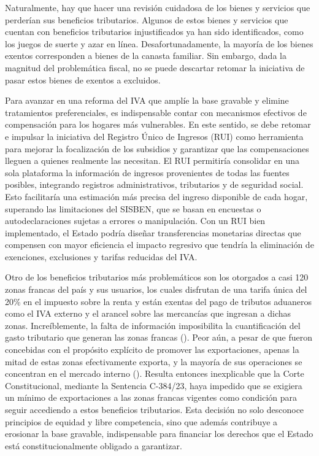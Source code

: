 Naturalmente, hay que hacer una revisión cuidadosa de los bienes y servicios que perderían sus beneficios tributarios. Algunos de estos bienes y servicios que cuentan con beneficios tributarios injustificados ya han sido identificados, como los juegos de suerte y azar en línea. Desafortunadamente, la mayoría de los bienes exentos corresponden a bienes de la canasta familiar. Sin embargo, dada la magnitud del problemática fiscal, no se puede descartar retomar la iniciativa de pasar estos bienes de exentos a excluidos. 

Para avanzar en una reforma del IVA que amplíe la base gravable y elimine tratamientos preferenciales, es indispensable contar con mecanismos efectivos de compensación para los hogares más vulnerables. En este sentido, se debe retomar e impulsar la iniciativa del Registro Único de Ingresos (RUI) como herramienta para mejorar la focalización de los subsidios y garantizar que las compensaciones lleguen a quienes realmente las necesitan. El RUI permitiría consolidar en una sola plataforma la información de ingresos provenientes de todas las fuentes posibles, integrando registros administrativos, tributarios y de seguridad social. Esto facilitaría una estimación más precisa del ingreso disponible de cada hogar, superando las limitaciones del SISBEN, que se basan en encuestas o autodeclaraciones sujetas a errores o manipulación. Con un RUI bien implementado, el Estado podría diseñar transferencias monetarias directas que compensen con mayor eficiencia el impacto regresivo que tendría la eliminación de exenciones, exclusiones y tarifas reducidas del IVA.

Otro de los beneficios tributarios más problemáticos son los otorgados a casi 120 zonas francas del país y sus usuarios, los cuales disfrutan de una tarifa única del 20\% en el impuesto sobre la renta y están exentas del pago de tributos aduaneros como el IVA externo y el arancel sobre las mercancías que ingresan a dichas zonas. Increíblemente, la falta de información imposibilita la cuantificación del gasto tributario que generan las zonas francas (\cite{MatamorosVillalba2024}). Peor aún, a pesar de que fueron concebidas con el propósito explícito de promover las exportaciones, apenas la mitad de estas zonas efectivamente exporta, y la mayoría de sus operaciones se concentran en el mercado interno (\cite{Villabona2025}). Resulta entonces inexplicable que la Corte Constitucional, mediante la Sentencia C-384/23, haya impedido que se exigiera un mínimo de exportaciones a las zonas francas vigentes como condición para seguir accediendo a estos beneficios tributarios. Esta decisión no solo desconoce principios de equidad y libre competencia, sino que además contribuye a erosionar la base gravable, indispensable para financiar los derechos que el Estado está constitucionalmente obligado a garantizar.

